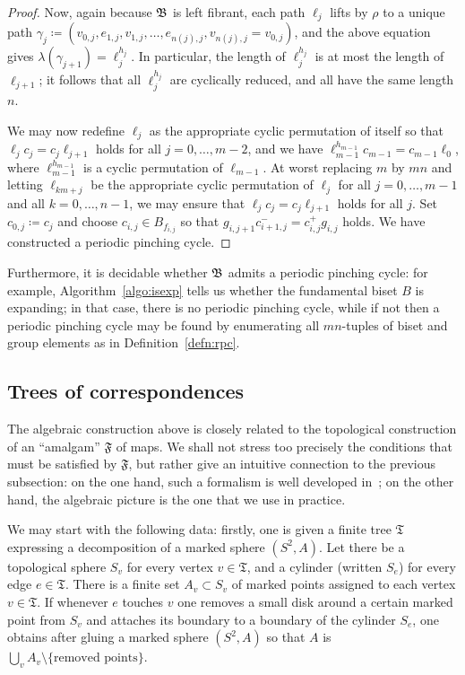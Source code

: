 \documentclass{amsart}
\begin{document}
\begin{proof}
  Now, again because ${\mathfrak B}$ is left fibrant, each path $\ell_j$ lifts
  by $\rho$ to a unique path
  $\gamma_j\coloneqq(v_{0,j},e_{1,j},v_{1,j},\dots,e_{n(j),j},v_{n(j),j}=v_{0,j})$,
  and the above equation gives
  $\lambda(\gamma_{j+1})=\ell_j^{h_j}$. In particular, the length of
  $\ell_j^{h_j}$ is at most the length of $\ell_{j+1}$; it follows
  that all $\ell_j^{h_j}$ are cyclically reduced, and all have the
  same length $n$.

  We may now redefine $\ell_j$ as the appropriate cyclic permutation
  of itself so that $\ell_j c_j=c_j\ell_{j+1}$ holds for all
  $j=0,\dots,m-2$, and we have
  $\ell_{m-1}^{h_{m-1}}c_{m-1}=c_{m-1}\ell_0$, where
  $\ell_{m-1}^{h_{m-1}}$ is a cyclic permutation of $\ell_{m-1}$. At
  worst replacing $m$ by $m n$ and letting $\ell_{km+j}$ be the
  appropriate cyclic permutation of $\ell_j$ for all $j=0,\dots,m-1$
  and all $k=0,\dots,n-1$, we may ensure that
  $\ell_j c_j=c_j\ell_{j+1}$ holds for all $j$. Set
  $c_{0,j}\coloneqq c_j$ and choose $c_{i,j}\in B_{f_{i,j}}$ so that
  $g_{i,j+1} c_{i+1,j}^-=c_{i,j}^+ g_{i,j}$ holds. We have constructed
  a periodic pinching cycle.
\end{proof}

Furthermore, it is decidable whether ${\mathfrak B}$ admits a periodic pinching
cycle: for example, Algorithm~\ref{algo:isexp} tells us whether the
fundamental biset $B$ is expanding; in that case, there is no periodic
pinching cycle, while if not then a periodic pinching cycle may be
found by enumerating all $m n$-tuples of biset and group elements as in
Definition~\ref{defn:rpc}.

\subsection{Trees of correspondences}
The algebraic construction above is closely related to the topological
construction of an ``amalgam'' $\mathfrak F$ of maps.  We shall not
stress too precisely the conditions that must be satisfied by
$\mathfrak F$, but rather give an intuitive connection to the previous
subsection: on the one hand, such a formalism is well developed
in~\cite{pilgrim:combinations}; on the other hand, the algebraic
picture is the one that we use in practice.

We may start with the following data: firstly, one is given a finite
tree $\mathfrak T$ expressing a decomposition of a marked sphere
$(S^2,A)$. Let there be a topological sphere $S_v$ for every vertex
$v\in\mathfrak T$, and a cylinder (written $S_e$) for every edge
$e\in\mathfrak T$. There is a finite set $A_v\subset S_v$ of marked
points assigned to each vertex $v\in \mathfrak T$. If whenever $e$
touches $v$ one removes a small disk around a certain marked point
from $S_v$ and attaches its boundary to a boundary of the cylinder
$S_e$, one obtains after gluing a marked sphere $(S^2,A)$ so that $A$
is $\bigcup_v A_v\setminus\{\text{removed points}\}$.
\end{document}
